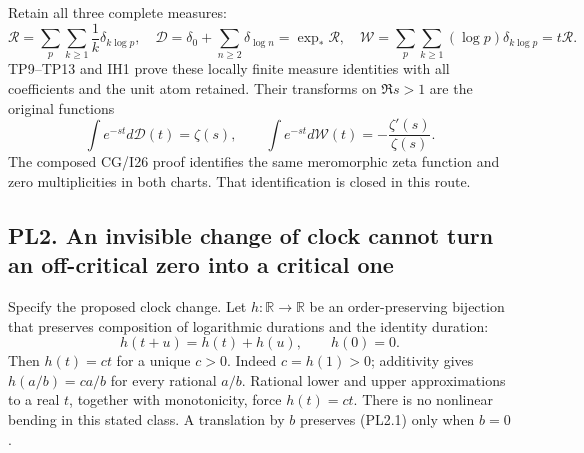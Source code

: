 Retain all three complete measures: \[
\mathcal R=\sum_p\sum_{k\ge1}\frac1k\delta_{k\log p},\quad
\mathcal D=\delta_0+\sum_{n\ge2}\delta_{\log n}=\exp_*\mathcal R,\quad
\mathcal W=\sum_p\sum_{k\ge1}(\log p)\delta_{k\log p}=t\mathcal R.
\tag{PL1.3}
\] TP9--TP13 and IH1 prove these locally finite measure identities with
all coefficients and the unit atom retained. Their transforms on
\(\Re s>1\) are the original functions \[
\int e^{-st}d\mathcal D(t)=\zeta(s),\qquad
\int e^{-st}d\mathcal W(t)=-\frac{\zeta'(s)}{\zeta(s)}.
\tag{PL1.4}
\] The composed CG/I26 proof identifies the same meromorphic zeta
function and zero multiplicities in both charts. That identification is
closed in this route.

\subsection{PL2. An invisible change of clock cannot turn an
off-critical zero into a critical
one}\label{pl2.-an-invisible-change-of-clock-cannot-turn-an-off-critical-zero-into-a-critical-one}

Specify the proposed clock change. Let \(h:\mathbb R\to\mathbb R\) be an
order-preserving bijection that preserves composition of logarithmic
durations and the identity duration: \[
h(t+u)=h(t)+h(u),\qquad h(0)=0.
\tag{PL2.1}
\] Then \(h(t)=ct\) for a unique \(c>0\). Indeed \(c=h(1)>0\);
additivity gives \(h(a/b)=ca/b\) for every rational \(a/b\). Rational
lower and upper approximations to a real \(t\), together with
monotonicity, force \(h(t)=ct\). There is no nonlinear bending in this
stated class. A translation by \(b\) preserves (PL2.1) only when
\(b=0\).

